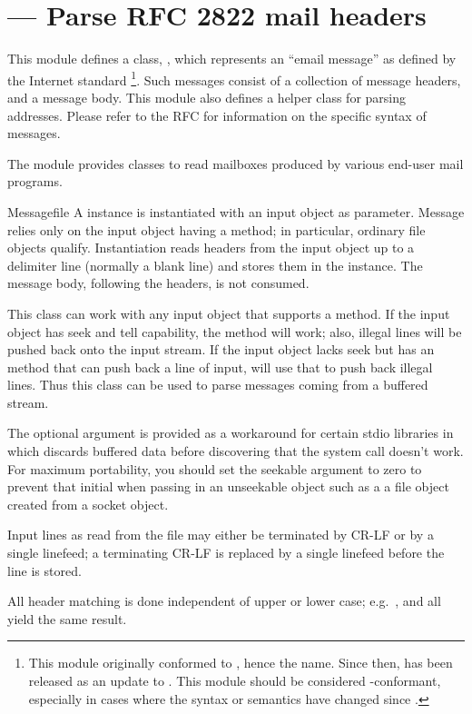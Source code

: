 \section{ ---
         Parse RFC 2822 mail headers}


This module defines a class, , which represents an
``email message'' as defined by the Internet standard
\footnote{This module originally conformed to ,
hence the name.  Since then,  has been released as an
update to .  This module should be considered
-conformant, especially in cases where the
syntax or semantics have changed since .}.  Such messages
consist of a collection of message headers, and a message body.  This
module also defines a helper class
 for parsing  addresses.  Please refer to
the RFC for information on the specific syntax of  messages.

The  module provides classes 
to read mailboxes produced by various end-user mail programs.

\begin{classdesc}{Message}{file}
A  instance is instantiated with an input object as
parameter.  Message relies only on the input object having a
 method; in particular, ordinary file objects
qualify.  Instantiation reads headers from the input object up to a
delimiter line (normally a blank line) and stores them in the
instance.  The message body, following the headers, is not consumed.

This class can work with any input object that supports a
 method.  If the input object has seek and tell
capability, the  method will work; also, illegal
lines will be pushed back onto the input stream.  If the input object
lacks seek but has an  method that can push back a
line of input,  will use that to push back illegal
lines.  Thus this class can be used to parse messages coming from a
buffered stream.

The optional  argument is provided as a workaround for
certain stdio libraries in which  discards buffered
data before discovering that the  system call
doesn't work.  For maximum portability, you should set the seekable
argument to zero to prevent that initial  when passing
in an unseekable object such as a a file object created from a socket
object.

Input lines as read from the file may either be terminated by CR-LF or
by a single linefeed; a terminating CR-LF is replaced by a single
linefeed before the line is stored.

All header matching is done independent of upper or lower case;
e.g.\ ,  and
 all yield the same result.
\end{classdesc}

